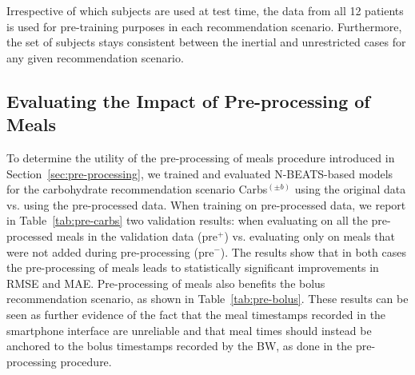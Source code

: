 \documentclass[journal,article,submit,moreauthors,pdftex]{Definitions/mdpi}
\begin{document}
Irrespective of which subjects are used at test time, the data from all 12 patients is used for pre-training purposes in each recommendation scenario. Furthermore, the set of subjects stays consistent between the inertial and unrestricted cases for any given recommendation scenario.

\subsection{Evaluating the Impact of Pre-processing of Meals}
\label{sec:pre-evaluation}

To determine the utility of the pre-processing of meals procedure introduced in Section~\ref{sec:pre-processing}, we trained and evaluated N-BEATS-based models for the carbohydrate recommendation scenario Carbs$^{(\pm b)}$ using the original data vs. using the pre-processed data. When training on pre-processed data, we report in Table~\ref{tab:pre-carbs} two validation results: when evaluating on all the pre-processed meals in the validation data (pre$^+$)  vs. evaluating only on meals that were not added during pre-processing (pre$^-$). The results show that in both cases the pre-processing of meals leads to statistically significant improvements in RMSE and MAE. Pre-processing of meals also benefits the bolus recommendation scenario, as shown in Table~\ref{tab:pre-bolus}. These results can be seen as further evidence of the fact that the meal timestamps recorded in the smartphone interface are unreliable and that meal times should instead be anchored to the bolus timestamps recorded by the BW, as done in the pre-processing procedure.
\end{document}
